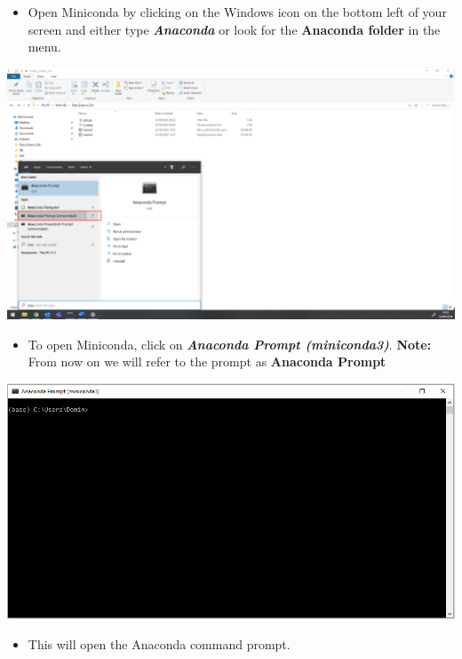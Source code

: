 \documentclass[
]{book}
\providecommand{\tightlist}{%
  \setlength{\itemsep}{0pt}\setlength{\parskip}{0pt}}
\begin{document}
\begin{itemize}
\tightlist
\item
  Open Miniconda by clicking on the Windows icon on the bottom left of your screen and either type \textbf{\emph{Anaconda}} or look for the \textbf{Anaconda folder} in the menu.
\end{itemize}

\begin{center}\includegraphics[width=29.85in]{figs/chp4/Picture21} \end{center}

\begin{itemize}
\tightlist
\item
  To open Miniconda, click on \textbf{\emph{Anaconda Prompt (miniconda3)}}.
  \textbf{Note:} From now on we will refer to the prompt as \textbf{Anaconda Prompt}
\end{itemize}

\begin{center}\includegraphics[width=13.64in]{figs/chp4/Conda_1} \end{center}

\begin{itemize}
\tightlist
\item
  This will open the Anaconda command prompt.
\end{itemize}
\end{document}
